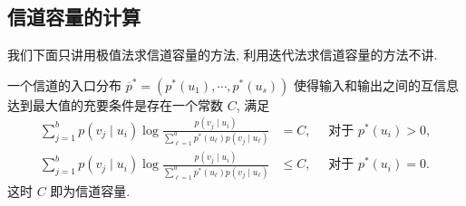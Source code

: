 \subsection{信道容量的计算}
我们下面只讲用极值法求信道容量的方法, 利用迭代法求信道容量的方法不讲.

\begin{theorem}
    一个信道的入口分布 $ \overline{p}^{*}=\left(p^{*}\left(u_{1}\right), \cdots, p^{*}\left(u_{s}\right)\right) $ 使得输入和输出之间的互信息达到最大值的充要条件是存在一个常数 $ C $, 满足
$$
\begin{aligned}
\sum_{j=1}^{b} p\left(v_{j} \mid u_{i}\right) \log \frac{p\left(v_{j} \mid u_{i}\right)}{\sum\limits_{\ell=1}^{a} p^{*}\left(u_{\ell}\right) p\left(v_{j} \mid u_{\ell}\right)}&=C, \quad \text { 对于 } p^{*}\left(u_{i}\right)>0, \\
\sum_{j=1}^{b} p\left(v_{j} \mid u_{i}\right) \log \frac{p\left(v_{j} \mid u_{i}\right)}{\sum\limits_{\ell=1}^{a} p^{*}\left(u_{\ell}\right) p\left(v_{j} \mid u_{\ell}\right)} &\leq C, \quad \text { 对于 } p^{*}\left(u_{i}\right)=0 .
\end{aligned}
$$
这时 $ C $ 即为信道容量.
\end{theorem}
